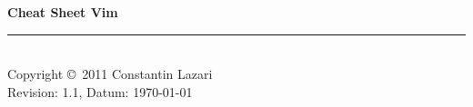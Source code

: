 \documentclass[10pt,landscape]{scrartcl}
\begin{document}
	\raggedright
	\footnotesize
	\begin{multicols}{3}


	\setlength{\premulticols}{1pt}
	\setlength{\postmulticols}{1pt}
	\setlength{\multicolsep}{1pt}
	\setlength{\columnsep}{2pt}
	\newlength{\MyLen}
	\newlength{\MyLenB}
	
	\begin{center}
	\Large{\textbf{Cheat Sheet Vim}} \\
	\end{center}

	

	
	
	
	
	
	
	
	
	
	
	\rule{0.3\linewidth}{0.25pt}\\
	\scriptsize
	Copyright \copyright\ 2011 Constantin Lazari\\
	Revision: 1.1, Datum: \today\\
	\end{multicols}
\end{document}
